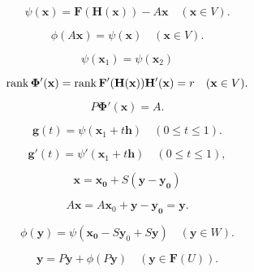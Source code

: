 \begin{equation}
    \label{eq:9.72}
    \psi(\mathbf{x}) = \mathbf{F(H(x))} - A\mathbf{x}
    \quad
    (\mathbf{x} \in V).
\end{equation}

\begin{equation}
    \label{eq:9.73}
    \phi(A \mathbf{x}) = \psi(\mathbf{x})
    \quad
    (\mathbf{x} \in V).
\end{equation}

\begin{equation}
    \label{eq:9.74}
    \psi(\mathbf{x}_1) =
    \psi(\mathbf{x}_2)
\end{equation}


\begin{equation}
    \label{eq:9.75}
    \operatorname{\operatorname{rank}} \mathbf{\Phi'(x)} =
    \operatorname{\operatorname{rank}} \mathbf{F'(H(x))H'(x)} = r
    \quad
    (\mathbf{x} \in V).
\end{equation}


\begin{equation}
    \label{eq:9.76}
    P \mathbf{\Phi'(x)} = A.
\end{equation}


\begin{equation}
    \label{eq:9.77}
    \mathbf{g}(t) = \psi(\mathbf{x}_1 + t \mathbf{h})
    \quad
    (0 \leq t \leq 1).
\end{equation}

\begin{equation}
    \label{eq:9.78}
    \mathbf{g}'(t) = \psi'(\mathbf{x}_1 + t \mathbf{h})
    \quad
    (0 \leq t \leq 1),
\end{equation}


\begin{equation}
    \label{eq:9.79}
    \mathbf{x} = \mathbf{x_0} + S(\mathbf{y-y_0})
\end{equation}

\begin{equation*}
    A \mathbf{x} =
    A \mathbf{x}_0 + \mathbf{y-y_0} = \mathbf{y} .
\end{equation*}

\begin{equation}
    \label{eq:9.80}
    \phi(\mathbf{y}) = \psi(\mathbf{x_0} - S\mathbf{y}_0 + S\mathbf{y})
    \quad
    (\mathbf{y} \in W).
\end{equation}



\begin{equation}
    \label{eq:9.81}
    \mathbf{y} = P \mathbf{y} + \phi(P \mathbf{y})
    \quad
    (\mathbf{y} \in \mathbf{F}(U)).
\end{equation}